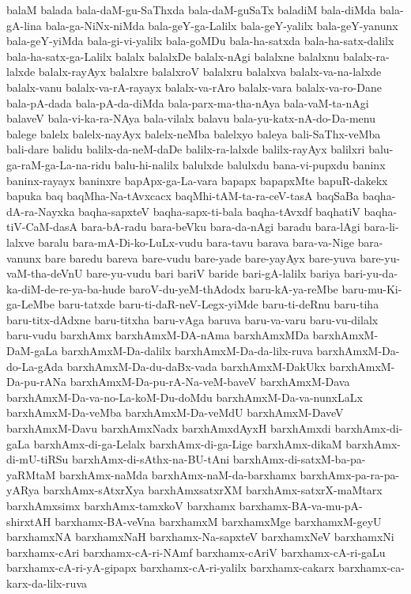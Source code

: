 {balaM
balada
bala-daM-gu-SaThxda
bala-daM-guSaTx
baladiM
bala-diMda
bala-gA-lina
bala-ga-NiNx-niMda
bala-geY-ga-Lalilx
bala-geY-yalilx
bala-geY-yanunx
bala-geY-yiMda
bala-gi-vi-yalilx
bala-goMDu
bala-ha-satxda
bala-ha-satx-dalilx
bala-ha-satx-ga-Lalilx
balalx
balalxDe
balalx-nAgi
balalxne
balalxnu
balalx-ra-lalxde
balalx-rayAyx
balalxre
balalxroV
balalxru
balalxva
balalx-va-na-lalxde
balalx-vanu
balalx-va-rA-rayayx
balalx-va-rAro
balalx-vara
balalx-va-ro-Dane
bala-pA-dada
bala-pA-da-diMda
bala-parx-ma-tha-nAya
bala-vaM-ta-nAgi
balaveV
bala-vi-ka-ra-NAya
bala-vilalx
balavu
bala-yu-katx-nA-do-Da-menu
balege
balelx
balelx-nayAyx
balelx-neMba
balelxyo
baleya
bali-SaThx-veMba
bali-dare
balidu
balilx-da-neM-daDe
balilx-ra-lalxde
balilx-rayAyx
balilxri
balu-ga-raM-ga-La-na-ridu
balu-hi-nalilx
balulxde
balulxdu
bana-vi-pupxdu
baninx
baninx-rayayx
baninxre
bapApx-ga-La-vara
bapapx
bapapxMte
bapuR-dakekx
bapuka
baq
baqMha-Na-tAvxcacx
baqMhi-tAM-ta-ra-ceV-tasA
baqSaBa
baqha-dA-ra-Nayxka
baqha-sapxteV
baqha-sapx-ti-bala
baqha-tAvxdf
baqhatiV
baqha-tiV-CaM-dasA
bara-bA-radu
bara-beVku
bara-da-nAgi
baradu
bara-lAgi
bara-li-lalxve
baralu
bara-mA-Di-ko-LuLx-vudu
bara-tavu
barava
bara-va-Nige
bara-vanunx
bare
baredu
bareva
bare-vudu
bare-yade
bare-yayAyx
bare-yuva
bare-yu-vaM-tha-deVnU
bare-yu-vudu
bari
bariV
baride
bari-gA-lalilx
bariya
bari-yu-da-ka-diM-de-re-ya-ba-hude
baroV-du-yeM-thAdodx
baru-kA-ya-reMbe
baru-mu-Ki-ga-LeMbe
baru-tatxde
baru-ti-daR-neV-Legx-yiMde
baru-ti-deRnu
baru-tiha
baru-titx-dAdxne
baru-titxha
baru-vAga
baruva
baru-va-varu
baru-vu-dilalx
baru-vudu
barxhAmx
barxhAmxM-DA-nAma
barxhAmxMDa
barxhAmxM-DaM-gaLa
barxhAmxM-Da-dalilx
barxhAmxM-Da-da-lilx-ruva
barxhAmxM-Da-do-La-gAda
barxhAmxM-Da-du-daBx-vada
barxhAmxM-DakUkx
barxhAmxM-Da-pu-rANa
barxhAmxM-Da-pu-rA-Na-veM-baveV
barxhAmxM-Dava
barxhAmxM-Da-va-no-La-koM-Du-doMdu
barxhAmxM-Da-va-nunxLaLx
barxhAmxM-Da-veMba
barxhAmxM-Da-veMdU
barxhAmxM-DaveV
barxhAmxM-Davu
barxhAmxNadx
barxhAmxdAyxH
barxhAmxdi
barxhAmx-di-gaLa
barxhAmx-di-ga-Lelalx
barxhAmx-di-ga-Lige
barxhAmx-dikaM
barxhAmx-di-mU-tiRSu
barxhAmx-di-sAthx-na-BU-tAni
barxhAmx-di-satxM-ba-pa-yaRMtaM
barxhAmx-naMda
barxhAmx-naM-da-barxhamx
barxhAmx-pa-ra-pa-yARya
barxhAmx-sAtxrXya
barxhAmxsatxrXM
barxhAmx-satxrX-maMtarx
barxhAmxsimx
barxhAmx-tamxkoV
barxhamx
barxhamx-BA-va-mu-pA-shirxtAH
barxhamx-BA-veVna
barxhamxM
barxhamxMge
barxhamxM-geyU
barxhamxNA
barxhamxNaH
barxhamx-Na-sapxteV
barxhamxNeV
barxhamxNi
barxhamx-cAri
barxhamx-cA-ri-NAmf
barxhamx-cAriV
barxhamx-cA-ri-gaLu
barxhamx-cA-ri-yA-gipapx
barxhamx-cA-ri-yalilx
barxhamx-cakarx
barxhamx-ca-karx-da-lilx-ruva
}
